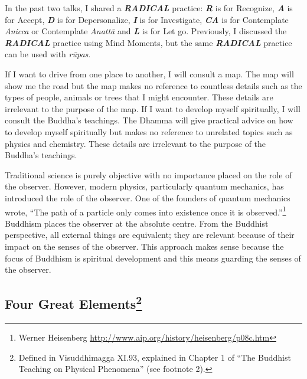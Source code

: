 In the past two talks, I shared a \textbf{\textit{RADICAL}} \color{blue} practice\color{black}: \textbf{\textit{R}} is for Recognize, \textbf{\textit{A}} is for Accept, \textbf{\textit{D}} is for Depersonalize, \textbf{\textit{I}} is for Investigate, \textbf{\textit{CA}} is for Contemplate \textit{Anicca} or Contemplate \textit{Anattā} and \textit{\textbf{L}} is for Let go. Previously, I discussed the \textbf{\textit{RADICAL}} \color{blue} practice\color{black} using Mind Moments, but the same \textbf{\textit{RADICAL}} \color{blue} practice\color{black} can be used with \textit{rūpas}.

If I want to drive from one place to another, I will consult a map. The map will show me the road but the map makes no reference to countless details such as the types of people, animals or trees that I might encounter. These details are irrelevant to the purpose of the map. If I want to develop myself spiritually, I will consult the Buddha’s teachings. The Dhamma will give practical advice on how to develop myself spiritually but makes no reference to unrelated topics such as physics and chemistry. These details are irrelevant to the purpose of the Buddha’s teachings.

Traditional science is purely objective with no importance placed on the role of the observer. However, modern physics, particularly quantum mechanics, has introduced the role of the observer. One of the founders of quantum mechanics wrote, “The path of a particle only comes into existence once it is observed.”\footnote{Werner Heisenberg \url{http://www.aip.org/history/heisenberg/p08c.htm}} Buddhism places the observer at the absolute centre. From the Buddhist perspective, all external things are equivalent; they are relevant because of their impact on the senses of the observer. This approach makes sense because the focus of Buddhism is spiritual development and this means guarding the senses of the observer.

\subsection*{Four Great Elements\footnote{Defined in Visuddhimagga XI.93, explained in Chapter 1 of “The Buddhist Teaching on Physical Phenomena” (see footnote 2).}}

